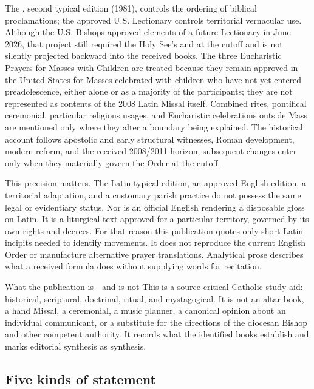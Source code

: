 {The , second typical edition (1981), controls the ordering of biblical proclamations; the approved U.S. Lectionary controls territorial vernacular use. Although the U.S. Bishops approved elements of a future Lectionary in June 2026, that project still required the Holy See's  and  at the cutoff and is not silently projected backward into the received books. The three Eucharistic Prayers for Masses with Children are treated because they remain approved in the United States for Masses celebrated with children who have not yet entered preadolescence, either alone or as a majority of the participants; they are not represented as contents of the 2008 Latin Missal itself. Combined rites, pontifical ceremonial, particular religious usages, and Eucharistic celebrations outside Mass are mentioned only where they alter a boundary being explained. The historical account follows apostolic and early structural witnesses, Roman development, modern reform, and the received 2008/2011 horizon; subsequent changes enter only when they materially govern the Order at the cutoff.

This precision matters. The Latin typical edition, an approved English edition, a territorial adaptation, and a customary parish practice do not possess the same legal or evidentiary status. Nor is an official English rendering a disposable gloss on Latin. It is a liturgical text approved for a particular territory, governed by its own rights and decrees. For that reason this publication quotes only short Latin incipits needed to identify movements. It does not reproduce the current English Order or manufacture alternative prayer translations. Analytical prose describes what a received formula does without supplying words for recitation.

\begin{massbox}{What the publication is---and is not}
This is a source-critical Catholic study aid: historical, scriptural, doctrinal, ritual, and mystagogical. It is not an altar book, a hand Missal, a ceremonial, a music planner, a canonical opinion about an individual communicant, or a substitute for the directions of the diocesan Bishop and other competent authority. It records what the identified books establish and marks editorial synthesis as synthesis.
\end{massbox}

\subsection{Five kinds of statement}

}
